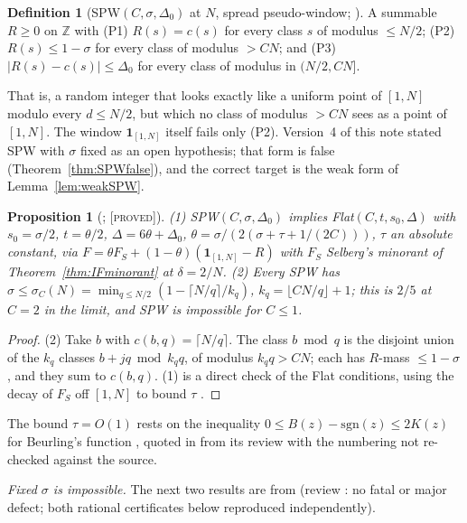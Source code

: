 \documentclass[10pt,reqno]{amsart}
\newtheorem{proposition}[theorem]{Proposition}
\theoremstyle{definition}
\newtheorem{definition}[theorem]{Definition}
\theoremstyle{remark}
\newcommand{\Z}{\mathbb Z}
\newcommand{\ind}{\mathbf 1}
\newcommand{\lab}[1]{\textup{[\textsc{#1}]}}
\begin{document}
\begin{definition}[SPW$(C,\sigma,\Delta_0)$ at $N$, spread pseudo-window; {\cite[\S9]{IF2}}]\label{def:SPW}
A summable $R\geq0$ on $\Z$ with (P1) $R(s)=c(s)$ for every class $s$ of
modulus $\leq N/2$; (P2) $R(s)\leq1-\sigma$ for every class of modulus $>CN$; and
(P3) $|R(s)-c(s)|\leq\Delta_0$ for every class of modulus in $(N/2,CN]$.
\end{definition}
That is, a random integer that looks exactly like a uniform point of
$[1,N]$ modulo every $d\leq N/2$, but which no class of modulus $>CN$ sees as a
point of $[1,N]$.  The window $\ind_{[1,N]}$ itself fails only (P2).
Version~4 of this note stated SPW with $\sigma$ fixed as an open hypothesis;
that form is false (Theorem~\ref{thm:SPWfalse}), and the correct target is
the weak form of Lemma~\ref{lem:weakSPW}.

\begin{proposition}[{\cite[Prop.~9.1, Lemma~9.3]{IF2}}; \lab{proved}]\label{prop:SPW}
(1) SPW$(C,\sigma,\Delta_0)$ implies Flat$(C,t,s_0,\Delta)$ with $s_0=\sigma/2$,
$t=\theta/2$, $\Delta=6\theta+\Delta_0$, $\theta=\sigma/(2(\sigma+\tau+1/(2C)))$, $\tau$ an
absolute constant, via $F=\theta F_S+(1-\theta)(\ind_{[1,N]}-R)$ with $F_S$
Selberg's minorant of Theorem~\ref{thm:IFminorant} at $\delta=2/N$.
(2) Every SPW has $\sigma\leq\sigma_C(N)=\min_{q\leq N/2}(1-\lceil N/q\rceil/k_q)$,
$k_q=\lfloor CN/q\rfloor+1$; this is $2/5$ at $C=2$ in the limit, and SPW is
impossible for $C\leq1$.
\end{proposition}
\begin{proof}
(2) Take $b$ with $c(b,q)=\lceil N/q\rceil$.  The class $b\bmod q$ is the
disjoint union of the $k_q$ classes $b+jq\bmod k_qq$, of modulus $k_qq>CN$;
each has $R$-mass $\leq1-\sigma$, and they sum to $c(b,q)$.  (1) is a direct
check of the Flat conditions, using the decay of $F_S$ off $[1,N]$ to bound
$\tau$ \cite[\S9]{IF2}.
\end{proof}
The bound $\tau=O(1)$ rests on the inequality $0\leq B(z)-\mathrm{sgn}(z)\leq2K(z)$
for Beurling's function \cite{Vaaler}, quoted in \cite{IF2} from its review
with the numbering not re-checked against the source.

\emph{Fixed $\sigma$ is impossible.}  The next two results are from \cite{SPW}
(review \cite{SPWrev}: no fatal or major defect; both rational
certificates below reproduced independently).
\end{document}
